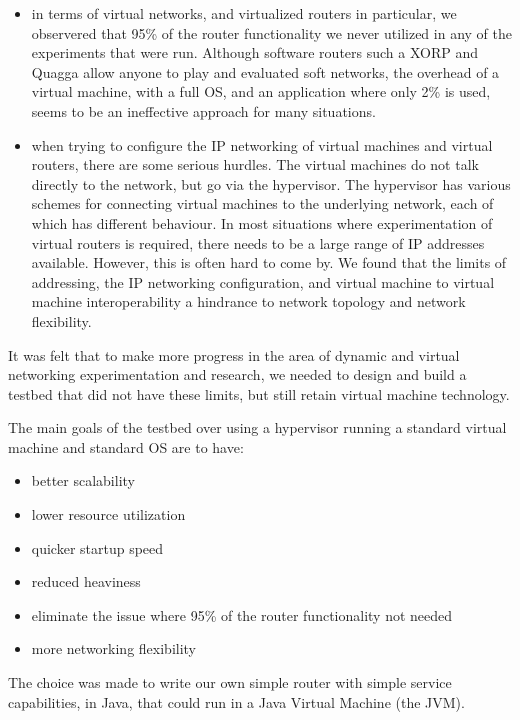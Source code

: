 \begin{itemize}[itemsep=1ex]

\item in terms of virtual networks, and virtualized routers in
  particular, we observered that 95\% of the router functionality we
  never utilized in any of the experiments that were run.  Although
  software routers such a XORP and Quagga allow anyone to play and
  evaluated soft networks, the overhead of a virtual machine, with a
  full OS, and an application where only 2\% is used, seems to be an
  ineffective approach for many situations.

\item when trying to configure the IP networking of virtual machines
  and virtual routers, there are some serious hurdles.  The virtual
  machines do not talk directly to the network, but go via the
  hypervisor.  The hypervisor has various schemes for connecting
  virtual machines to the underlying network, each of which has
  different behaviour.  In most situations where experimentation of
  virtual routers is required, there needs to be a large range of IP
  addresses available.  However, this is often hard to come by.
  We found that the limits of addressing, the IP networking
  configuration, and virtual machine to virtual machine
  interoperability a hindrance to network topology and network flexibility.


\end{itemize}

\noindent It was felt that to make more progress in the area of
dynamic and virtual networking experimentation and research, we needed
to design and build a testbed that did not have these limits, but still retain 
virtual machine technology.

The main goals of the testbed over using a hypervisor running a
standard virtual machine and standard OS are to have:

\begin{itemize}
\item better scalability
\item lower resource utilization
\item quicker startup speed 
\item reduced heaviness 
\item eliminate the issue where 95\% of the router functionality not needed
\item more networking flexibility
\end{itemize}

\noindent The choice was made to write our own simple router with
simple service capabilities, in Java, that
could run in a Java Virtual Machine (the JVM).

